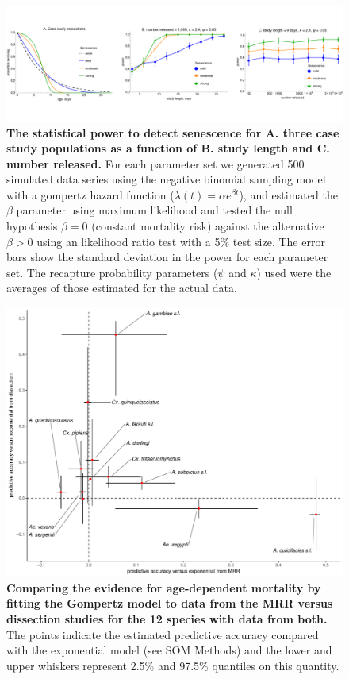 \documentclass[12pt]{article}
\begin{document}
\begin{figure}[ht]
	\centerline{\includegraphics[width=1.25\textwidth]{./Figure_files/mrr_mcPowerAnalysis_senescence.pdf}}
	\caption{\textbf{The statistical power to detect senescence for A. three case study populations as a function of B. study length and C. number released.} For each parameter set we generated 500 simulated data series using the negative binomial sampling model with a gompertz hazard function ($\lambda(t) = \alpha e^{\beta t}$), and estimated the $\beta$ parameter using maximum likelihood and tested the null hypothesis $\beta=0$ (constant mortality risk) against the alternative $\beta>0$ using an likelihood ratio test with a 5\% test size. The error bars show the standard deviation in the power for each parameter set. The recapture probability parameters ($\psi$ and $\kappa$) used were the averages of those estimated for the actual data.}
	\label{fig:mrr_mcPowerAnalysis_senescence}
\end{figure}

\begin{figure}[ht]
	\centerline{\includegraphics[width=1\textwidth]{./Figure_files/elpd_comparison.pdf}}
	\caption{\textbf{Comparing the evidence for age-dependent mortality by fitting the Gompertz model to data from the MRR versus dissection studies for the 12 species with data from both.} The points indicate the estimated predictive accuracy compared with the exponential model (see SOM Methods) and the lower and upper whiskers represent 2.5\% and 97.5\% quantiles on this quantity.}\label{fig:elpd_comparison}
\end{figure}
\end{document}

